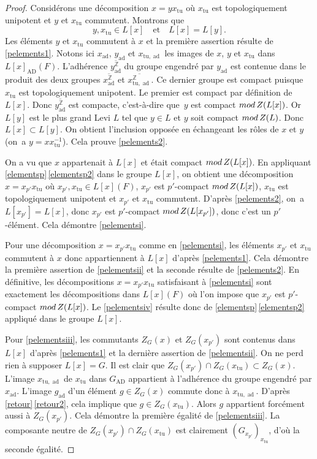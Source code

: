 \documentclass[11pt]{article}
\numberwithin{equation}{section}\providecommand{\og}{«\,}\providecommand{\fg}{\,»}
\newcommand{\quadet}{\quad\text{et}\quad}
\newcommand{\rmod}{\textup{mod}\,}
\newcommand{\AD}{\mathrm{AD}}
\newcommand{\tu}{\mathrm{tu}}
\DeclareMathOperator{\ad}{ad}
\newcommand{\ZZ}{\mathbb{Z}}
\theoremstyle{plain}
\theoremstyle{definition}
\begin{document}
\begin{proof}
Considérons une décomposition $x=yx_{\tu}$ où $x_{\tu}$ est topologiquement unipotent et $y$ et $x_{\tu}$ commutent. Montrons que
\begin{equation}\tag{2}\label{pelements2}
y,x_{\tu}\in L[x]\quadet L[x]=L[y].
\end{equation}
Les éléments $y$ et $x_{\tu}$ commutent à $x$ et la première assertion résulte de \eqref{pelements1}. Notons ici $x_{\ad}$, $y_{\ad}$ et $x_{\tu,\ad}$ les images de $x$, $y$ et $x_{\tu}$ dans $L[x]_{\AD}(F)$. L'adhérence $\overline{y_{\ad}^{\ZZ}}$ du groupe engendré par $y_{\ad}$ est contenue dans le produit des deux groupes $\overline{x_{\ad}^{\ZZ}}$ et $\overline{x_{\tu,\ad}^{\ZZ}}$. Ce dernier groupe est compact puisque $x_{\tu}$ est topologiquement unipotent. Le premier est compact par définition de $L[x]$. Donc $\overline{y_{\ad}^{\ZZ}}$ est compacte, c'est-à-dire que~$y$ est compact $\rmod Z(L[x])$. Or $L[y]$ est le plus grand Levi $L$ tel que $y\in L$ et $y$ soit compact $\rmod Z(L)$. Donc $L[x]\subset L[y]$. On obtient l'inclusion opposée en échangeant les rôles de $x$ et $y$ (on~a $y=xx_{\tu}^{-1}$). Cela prouve \eqref{pelements2}.

On a vu que $x$ appartenait à $ L[x]$ et était compact $\rmod Z(L[x])$. En appliquant \ref{elementsp}\,\eqref{elementsp2} dans le groupe $L[x]$, on obtient une décomposition $x=x_{p'}x_{\tu}$ où $x_{p'}, x_{\tu}\in L[x](F)$, $x_{p'}$ est $p'$-compact $\rmod Z(L[x])$, $x_{\tu}$ est topologiquement unipotent et $x_{p'}$ et $x_{\tu}$ commutent. D'après \eqref{pelements2}, on~a $L[x_{p'}]=L[x]$, donc $x_{p'}$ est $p'$-compact $\rmod Z(L[x_{p'}])$, donc c'est un $p'$-élément. Cela démontre \eqref{pelementsi}.

Pour une décomposition $x=x_{p'}x_{\tu}$ comme en \eqref{pelementsi}, les éléments $x_{p'}$ et $x_{\tu}$ commutent à $x$ donc appartiennent à $L[x]$ d'après \eqref{pelements1}. Cela démontre la première assertion de \eqref{pelementsii} et la seconde résulte de \eqref{pelements2}. En définitive, les décompositions $x=x_{p'}x_{\tu}$ satisfaisant à \eqref{pelementsi} sont exactement les décompositions dans $L[x](F)$ où l'on impose que $x_{p'}$ est $p'$-compact $\rmod Z(L[x])$. Le \eqref{pelementsiv} résulte donc de \ref{elementsp}\,\eqref{elementsp2} appliqué dans le groupe $L[x]$.

Pour \eqref{pelementsiii}, les commutants $Z_{G}(x)$ et $Z_{G}(x_{p'})$ sont contenus dans $L[x]$ d'après \eqref{pelements1} et la dernière assertion de \eqref{pelementsii}. On ne perd rien à supposer $L[x]=G$. Il est clair que $Z_{G}(x_{p'})\cap Z_{G}(x_{\tu})\subset Z_{G}(x)$. L'image $x_{\tu,\ad}$ de $x_{\tu}$ dans $G_{\AD}$ appartient à l'adhérence du groupe engendré par $x_{\ad}$. L'image $g_{\ad}$ d'un élément $g\in Z_{G}(x)$ commute donc à $x_{\tu,\ad}$. D'après \ref{retour}\,\eqref{retour2}, cela implique que $g\in Z_{G}(x_{\tu})$. Alors $g$ appartient forcément aussi à $Z_{G}(x_{p'})$. Cela démontre la première égalité de \eqref{pelementsiii}. La composante neutre de $Z_{G}(x_{p'})\cap Z_{G}(x_{\tu})$ est clairement $(G_{x_{p'}})_{x_{\tu}}$, d'où la seconde égalité.
\end{proof}
\end{document}
